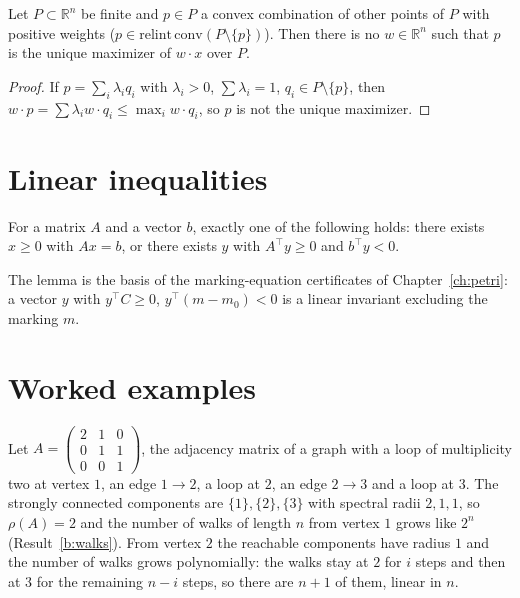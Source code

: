 \begin{newresult}\label{b:scal}
Let $P\subset\mathbb R^n$ be finite and $p\in P$ a convex combination of other points of $P$ with positive weights ($p\in\mathrm{relint}\,\mathrm{conv}(P\setminus\{p\})$). Then there is no $w\in\mathbb R^n$ such that $p$ is the unique maximizer of $w\cdot x$ over $P$.
\end{newresult}
\begin{proof}
If $p=\sum_i\lambda_iq_i$ with $\lambda_i>0$, $\sum\lambda_i=1$, $q_i\in P\setminus\{p\}$, then $w\cdot p=\sum\lambda_iw\cdot q_i\le\max_iw\cdot q_i$, so $p$ is not the unique maximizer.
\end{proof}

\section{Linear inequalities}

\begin{established}\label{b:farkas}
For a matrix $A$ and a vector $b$, exactly one of the following holds: there exists $x\ge0$ with $Ax=b$, or there exists $y$ with $A^\top y\ge0$ and $b^\top y<0$.
\end{established}

The lemma is the basis of the marking-equation certificates of Chapter~\ref{ch:petri}: a vector $y$ with $y^\top C\ge0$, $y^\top(m-m_0)<0$ is a linear invariant excluding the marking $m$.

\section{Worked examples}

\begin{example}\label{b:ex-growth}
Let $A=\begin{pmatrix}2&1&0\\0&1&1\\0&0&1\end{pmatrix}$, the adjacency matrix of a graph with a loop of multiplicity two at vertex $1$, an edge $1\to2$, a loop at $2$, an edge $2\to3$ and a loop at $3$. The strongly connected components are $\{1\},\{2\},\{3\}$ with spectral radii $2,1,1$, so $\rho(A)=2$ and the number of walks of length $n$ from vertex $1$ grows like $2^n$ (Result~\ref{b:walks}). From vertex $2$ the reachable components have radius $1$ and the number of walks grows polynomially: the walks stay at $2$ for $i$ steps and then at $3$ for the remaining $n-i$ steps, so there are $n+1$ of them, linear in $n$.
\end{example}

